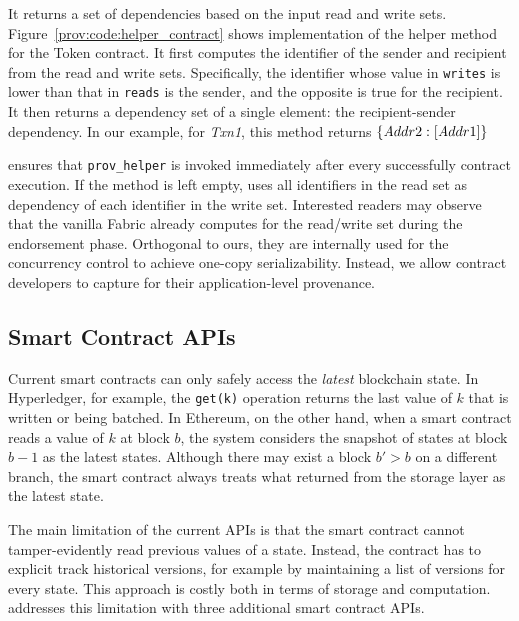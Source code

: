 It returns a set of dependencies based on the input read and write sets. Figure~\ref{prov:code:helper_contract}
shows implementation of the helper method for the Token contract. It first computes the identifier of the
sender and recipient from the read and write sets. Specifically, the identifier whose value in \texttt{writes} is lower than that
in \texttt{reads} is the sender, and the opposite is true for the recipient. It then returns a dependency set of
a single element: the recipient-sender dependency. In our example, for {\em Txn1}, this method returns
$\{{\textit Addr2}: [{\textit Addr1}]\}$ 

{\fs} ensures that \texttt{prov\_helper} is invoked immediately after every successfully contract execution.
If the method is left empty, {\fs} uses all identifiers in the read set as dependency of each identifier
in the write set. Interested readers may observe that the vanilla Fabric already computes for the read/write set
during the endorsement phase. 
Orthogonal to ours, they are internally used for the concurrency control to achieve one-copy serializability. 
Instead, we allow contract developers to capture for their application-level provenance. 


\subsection{Smart Contract APIs}
Current smart contracts can only safely access the {\em latest} blockchain state. In Hyperledger, for example, the \texttt{get(k)} operation returns the last value of $k$ that is written or being batched.  In Ethereum, on the other
hand, when a smart contract reads a value of $k$ at block $b$, the system considers the snapshot of states at
block $b-1$ as the latest states. Although there may exist a block $b' > b$ on a different branch, the
smart contract always treats what returned from the storage layer as the latest state.  

The main limitation of the current APIs is that the smart contract cannot tamper-evidently read previous values of a state.
Instead, the contract has to explicit track historical versions, for example by maintaining a list of versions
for every state. This approach is costly both in terms of storage and computation. {\fs} addresses this limitation with three additional smart contract APIs. 

